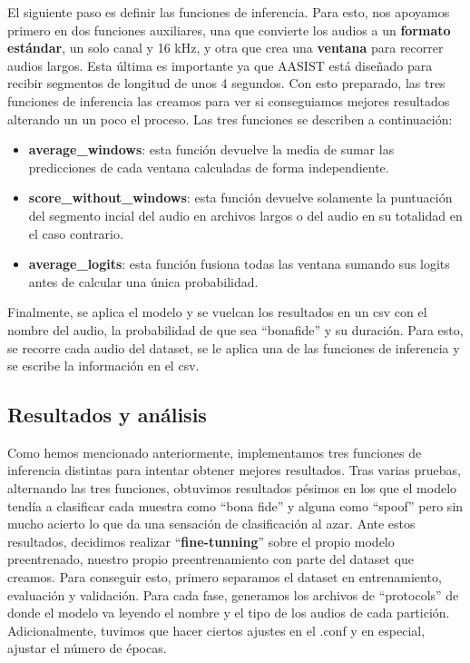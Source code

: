 El siguiente paso es definir las funciones de inferencia. Para esto, nos apoyamos primero en dos funciones auxiliares, una que convierte los audios a un \textbf{formato estándar}, un solo canal y 16 kHz, y otra que crea una \textbf{ventana} para recorrer audios largos. Esta última es importante ya que AASIST está diseñado para recibir segmentos de longitud de unos 4 segundos.
Con esto preparado, las tres funciones de inferencia las creamos para ver si conseguiamos mejores resultados alterando un un poco el proceso. Las tres funciones se describen a continuación:
\begin{itemize}
    \item \textbf{average\_windows}: esta función devuelve la media de sumar las predicciones de cada ventana calculadas de forma independiente. 
    \item \textbf{score\_without\_windows}: esta función devuelve solamente la puntuación del segmento incial del audio en archivos largos o del audio en su totalidad en el caso contrario.
    \item \textbf{average\_logits}: esta función fusiona todas las ventana sumando sus logits antes de calcular una única probabilidad.
\end{itemize}
Finalmente, se aplica el modelo y se vuelcan los resultados en un csv con el nombre del audio, la probabilidad de que sea ``bonafide'' y su duración. Para esto, se recorre cada audio del dataset, se le aplica una de las funciones de inferencia y se escribe la información en el csv.

\subsection*{Resultados y análisis}

Como hemos mencionado anteriormente, implementamos tres funciones de inferencia distintas para intentar obtener mejores resultados. Tras varias pruebas, alternando las tres funciones, obtuvimos resultados pésimos en los que el modelo tendía a clasificar cada muestra como ``bona fide'' y alguna como ``spoof'' pero sin mucho acierto lo que da una sensación de clasificación al azar.
Ante estos resultados, decidimos realizar ``\textbf{fine-tunning}'' sobre el propio modelo preentrenado, nuestro propio preentrenamiento con parte del dataset que creamos. Para conseguir esto, primero separamos el dataset en entrenamiento, evaluación y validación. Para cada fase, generamos los archivos de ``protocols'' de donde el modelo va leyendo el nombre y el tipo de los audios de cada partición. Adicionalmente, tuvimos que hacer ciertos ajustes en el .conf y en especial, ajustar el número de épocas.

